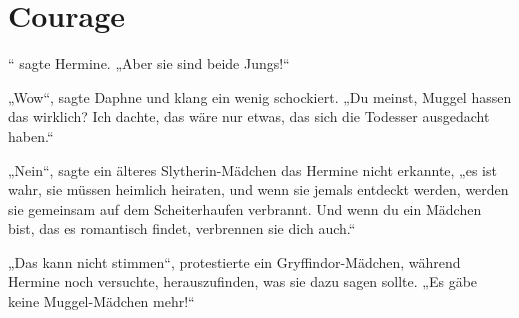 \chapter{Courage}

“ sagte Hermine.
„Aber sie sind beide Jungs!“

\hplettrineextrapara
„Wow“, sagte Daphne und klang ein wenig schockiert.
„Du meinst, Muggel hassen das wirklich? Ich dachte, das wäre nur etwas, das sich die Todesser ausgedacht haben.“

„Nein“, sagte ein älteres Slytherin-Mädchen das Hermine nicht erkannte, „es ist wahr, sie müssen heimlich heiraten, und wenn sie jemals entdeckt werden, werden sie gemeinsam auf dem Scheiterhaufen verbrannt. Und wenn du ein Mädchen bist, das es romantisch findet, verbrennen sie dich auch.“

„Das kann nicht stimmen“, protestierte ein Gryffindor-Mädchen, während Hermine noch versuchte, herauszufinden, was sie dazu sagen sollte.
„Es gäbe keine Muggel-Mädchen mehr!“

